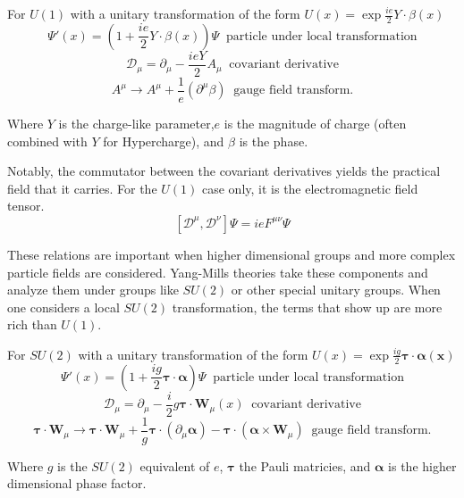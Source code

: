 For $U(1)$ with a unitary transformation of the form $U(x) = \exp{\frac{ie}{2}Y\cdot\beta(x)}$ 
\begin{equation}\Psi'(x)= (1+\frac{ie}{2}Y\cdot\beta(x))\Psi \;\;\text{particle under local transformation}\end{equation}
\begin{equation}\mathcal{D}_\mu = \partial_\mu - \frac{ieY}{2}A_\mu \;\;\text{covariant derivative}\end{equation}
\begin{equation}A^\mu \rightarrow A^\mu + \frac{1}{e}(\partial^\mu \beta) \;\;\text{gauge field transform.} \end{equation} 

Where $Y$ is the charge-like parameter,$e$ is the magnitude of charge (often combined with $Y$ for Hypercharge), and $\beta$ is the phase. 

Notably, the commutator between the covariant derivatives yields the practical field that it carries. For the $U(1)$ case only, it is the electromagnetic field tensor. 
\begin{equation}  \left[ \mathcal{D}^\mu,\mathcal{D}^\nu\right] \Psi = ie F^{\mu\nu} \Psi\end{equation}

These relations are important when higher dimensional groups and more complex particle fields are considered. Yang-Mills theories take these components and analyze them under groups like $SU(2)$ or other special unitary groups. When one considers a local $SU(2)$ transformation, the terms that show up are more rich than $U(1)$.  

For $SU(2)$ with a unitary transformation of the form $U(x) = \exp{\frac{ig}{2}\bm{\tau}\cdot\bm{\alpha(x)}}$ 
\begin{equation}\Psi'(x)= (1 + \frac{ig}{2}\bm{\tau}\cdot\bm{\alpha})\Psi \;\;\text{particle under local transformation}\end{equation}
\begin{equation}\mathcal{D}_\mu = \partial_\mu -\frac{i}{2} g \bm{\tau}\cdot \bm{W}_\mu(x) \;\;\text{covariant derivative}\end{equation}
\begin{equation}\bm{\tau}\cdot\bm{W}_\mu \rightarrow  \bm{\tau}\cdot\bm{W}_\mu + \frac{1}{g}\bm{\tau}\cdot(\partial_\mu \bm{\alpha}) - \bm{\tau}\cdot (\bm{\alpha}\times\bm{W}_\mu) \;\;\text{gauge field transform.} \end{equation}

Where $g$ is the $SU(2)$ equivalent of $e$, $\bm{\tau}$ the Pauli matricies, and $\bm{\alpha}$ is the higher dimensional phase factor.

